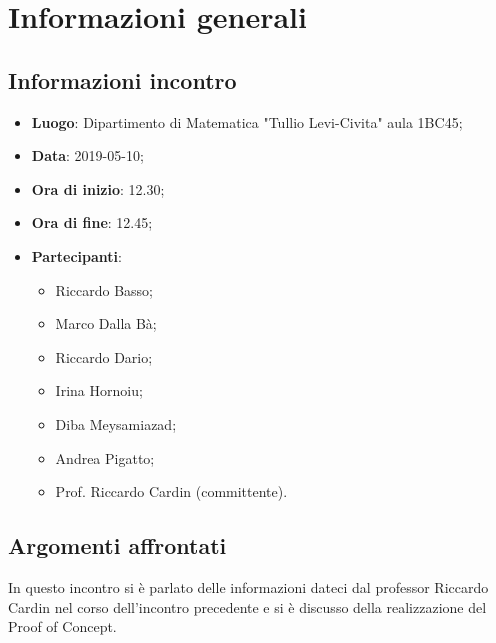 \section{Informazioni generali}

\subsection{Informazioni incontro}
\begin{itemize}
	\item \textbf{Luogo}: Dipartimento di Matematica "Tullio Levi-Civita" aula 1BC45;
	\item \textbf{Data}: 2019-05-10;
	\item \textbf{Ora di inizio}: 12.30;
	\item \textbf{Ora di fine}: 12.45;
	\item \textbf{Partecipanti}: 
	\begin{itemize}
		\item Riccardo Basso;
		\item Marco Dalla Bà;
		\item Riccardo Dario;
		\item Irina Hornoiu;
		\item Diba Meysamiazad;
		\item Andrea Pigatto;
		\item Prof. Riccardo Cardin (committente).	
	\end{itemize}
\end{itemize}

\subsection{Argomenti affrontati}
In questo incontro si è parlato delle informazioni dateci dal professor Riccardo Cardin nel corso dell'incontro precedente e si è discusso della realizzazione del Proof of Concept.
